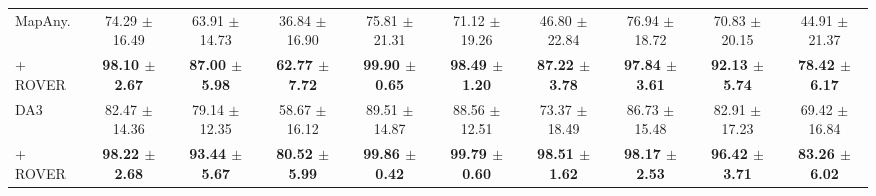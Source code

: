 \begin{table}[ht]
{\begin{tabular}{l ccc ccc ccc}
MapAny.
& 74.29 {\tiny $\pm$ 16.49} & 63.91 {\tiny $\pm$ 14.73} & 36.84 {\tiny $\pm$ 16.90}
& 75.81 {\tiny $\pm$ 21.31} & 71.12 {\tiny $\pm$ 19.26} & 46.80 {\tiny $\pm$ 22.84}
& 76.94 {\tiny $\pm$ 18.72} & 70.83 {\tiny $\pm$ 20.15} & 44.91 {\tiny $\pm$ 21.37} \\
\rowcolor{highlight}
\quad + ROVER
& \textbf{98.10 {\tiny $\pm$ 2.67}} & \textbf{87.00 {\tiny $\pm$ 5.98}} & \textbf{62.77 {\tiny $\pm$ 7.72}}
& \textbf{99.90 {\tiny $\pm$ 0.65}} & \textbf{98.49 {\tiny $\pm$ 1.20}} & \textbf{87.22 {\tiny $\pm$ 3.78}}
& \textbf{97.84 {\tiny $\pm$ 3.61}} & \textbf{92.13 {\tiny $\pm$ 5.74}} & \textbf{78.42 {\tiny $\pm$ 6.17}} \\
\addlinespace[3pt]

DA3
& 82.47 {\tiny $\pm$ 14.36} & 79.14 {\tiny $\pm$ 12.35} & 58.67 {\tiny $\pm$ 16.12}
& 89.51 {\tiny $\pm$ 14.87} & 88.56 {\tiny $\pm$ 12.51} & 73.37 {\tiny $\pm$ 18.49}
& 86.73 {\tiny $\pm$ 15.48} & 82.91 {\tiny $\pm$ 17.23} & 69.42 {\tiny $\pm$ 16.84} \\
\rowcolor{highlight}
\quad + ROVER
& \textbf{98.22 {\tiny $\pm$ 2.68}} & \textbf{93.44 {\tiny $\pm$ 5.67}} & \textbf{80.52 {\tiny $\pm$ 5.99}}
& \textbf{99.86 {\tiny $\pm$ 0.42}} & \textbf{99.79 {\tiny $\pm$ 0.60}} & \textbf{98.51 {\tiny $\pm$ 1.62}}
& \textbf{98.17 {\tiny $\pm$ 2.53}} & \textbf{96.42 {\tiny $\pm$ 3.71}} & \textbf{83.26 {\tiny $\pm$ 6.02}} \\

\bottomrule
\end{tabular}
}
\end{table}
